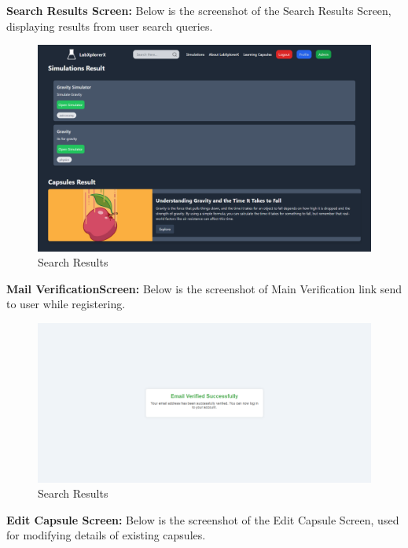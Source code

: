 \textbf{Search Results Screen:} Below is the screenshot of the Search Results Screen, displaying results from user search queries.
\begin{figure}[H]
    \centering
    \includegraphics[width = 16cm]{Diagrams/output/search_results.png}
    \caption{Search Results}
\end{figure}
\textbf{Mail VerificationScreen:} Below is the screenshot of Main Verification link send to user while registering.
\begin{figure}[H]
    \centering
    \includegraphics[width = 16cm]{Diagrams/output/verified.png}
    \caption{Search Results}
\end{figure}
\newpage
\textbf{Edit Capsule Screen:} Below is the screenshot of the Edit Capsule Screen, used for modifying details of existing capsules.
